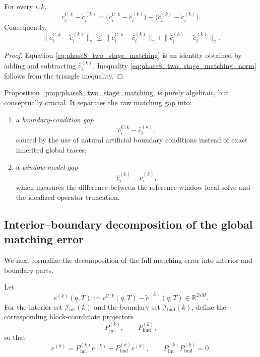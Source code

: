 \begin{proposition}
\label{prop:phase8_two_stage_matching}
For every \(i,k\),
\begin{equation}
\label{eq:phase8_two_stage_matching}
c_i^{\mathrm{C},k}-\tilde c_i^{(k)}
=
\bigl(c_i^{\mathrm{C},k}-\hat c_i^{(k)}\bigr)
+
\bigl(\hat c_i^{(k)}-\tilde c_i^{(k)}\bigr).
\end{equation}
Consequently,
\begin{equation}
\label{eq:phase8_two_stage_matching_norm}
\|c_i^{\mathrm{C},k}-\tilde c_i^{(k)}\|_2
\le
\|c_i^{\mathrm{C},k}-\hat c_i^{(k)}\|_2
+
\|\hat c_i^{(k)}-\tilde c_i^{(k)}\|_2.
\end{equation}
\end{proposition}

\begin{proof}
Equation \eqref{eq:phase8_two_stage_matching} is an identity obtained by adding and subtracting \(\hat c_i^{(k)}\).
Inequality \eqref{eq:phase8_two_stage_matching_norm} follows from the triangle inequality.
\end{proof}

\begin{remark}
\label{rem:phase8_meaning_of_two_stage_matching}
Proposition~\ref{prop:phase8_two_stage_matching} is purely algebraic, but conceptually crucial.
It separates the raw matching gap into:
\begin{enumerate}
    \item a \emph{boundary-condition gap}
    \[
    c_i^{\mathrm{C},k}-\hat c_i^{(k)},
    \]
    caused by the use of natural artificial boundary conditions instead of exact inherited global traces;
    \item a \emph{window-model gap}
    \[
    \hat c_i^{(k)}-\tilde c_i^{(k)},
    \]
    which measures the difference between the reference-window local solve and the idealized operator truncation.
\end{enumerate}
\end{remark}

\subsection{Interior--boundary decomposition of the global matching error}
\label{subsec:phase8_global_decomposition}

We next formalize the decomposition of the full matching error into interior and boundary parts.

Let
\[
e^{(k)}(q,T):=c^{\mathrm{C},k}(q,T)-\tilde c^{(k)}(q,T)\in\mathbb R^{2sM}.
\]
For the interior set \(\mathcal I_{\mathrm{int}}(k)\) and the boundary set \(\mathcal I_{\mathrm{bnd}}(k)\), define the corresponding block-coordinate projectors
\[
P_{\mathrm{int}}^{(k)},\qquad P_{\mathrm{bnd}}^{(k)},
\]
so that
\[
e^{(k)} = P_{\mathrm{int}}^{(k)} e^{(k)} + P_{\mathrm{bnd}}^{(k)} e^{(k)},
\qquad
P_{\mathrm{int}}^{(k)}P_{\mathrm{bnd}}^{(k)}=0.
\]

